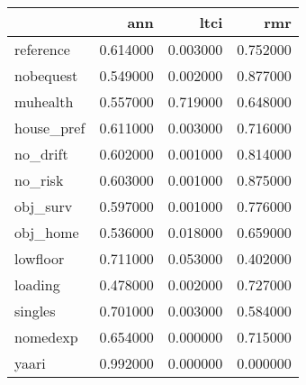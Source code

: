 \begin{tabular}{lrrr}
\toprule
 & ann & ltci & rmr \\
\midrule
reference & 0.614000 & 0.003000 & 0.752000 \\
nobequest & 0.549000 & 0.002000 & 0.877000 \\
muhealth & 0.557000 & 0.719000 & 0.648000 \\
house_pref & 0.611000 & 0.003000 & 0.716000 \\
no_drift & 0.602000 & 0.001000 & 0.814000 \\
no_risk & 0.603000 & 0.001000 & 0.875000 \\
obj_surv & 0.597000 & 0.001000 & 0.776000 \\
obj_home & 0.536000 & 0.018000 & 0.659000 \\
lowfloor & 0.711000 & 0.053000 & 0.402000 \\
loading & 0.478000 & 0.002000 & 0.727000 \\
singles & 0.701000 & 0.003000 & 0.584000 \\
nomedexp & 0.654000 & 0.000000 & 0.715000 \\
yaari & 0.992000 & 0.000000 & 0.000000 \\
\bottomrule
\end{tabular}
